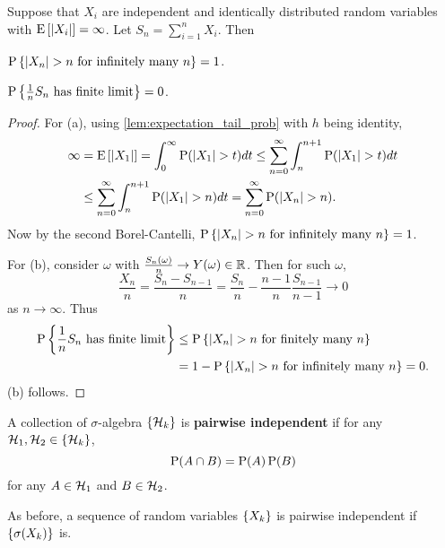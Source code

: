 \begin{proposition}
    Suppose that $X_i$ are independent and identically distributed random variables with 
    $\E\sbrc{\abs{X_i}}=\infty$. Let $S_n = \sum_{i=1}^nX_i$. Then 
    \begin{thmenum}
        \item $\P\set{\abs{X_n}>n\text{ for infinitely many $n$}} = 1$. 
        \item $\P\set{\frac{1}{n}S_n\text{ has finite limit}} = 0$. 
    \end{thmenum}
\end{proposition}
\begin{proof}
    For (a), using \cref{lem:expectation_tail_prob} with $h$ being identity, 
    \begin{equation*}
        \begin{split}
            \infty &= \E\sbrc{\abs{X_1}} = \int_0^\infty\P(\abs{X_1}>t)dt  
            \leq \sum_{n=0}^\infty\int_n^{n+1}\P(\abs{X_1}>t)dt \\
            &\leq \sum_{n=0}^\infty\int_n^{n+1}\P(\abs{X_1}>n)dt 
            = \sum_{n=0}^\infty\P(\abs{X_n}>n). 
        \end{split}
    \end{equation*}
    Now by the second Borel-Cantelli, $\P\set{\abs{X_n}>n\text{ for infinitely many $n$}} = 1$. 

    For (b), consider $\omega$ with $\frac{S_n(\omega)}{n}\to Y(\omega)\in\R$. 
    Then for such $\omega$, 
    \begin{equation*}
        \frac{X_n}{n} = \frac{S_n - S_{n-1}}{n} = \frac{S_n}{n} - \frac{n-1}{n}\frac{S_{n-1}}{n-1}\to 0
    \end{equation*}
    as $n\to\infty$. Thus 
    \begin{equation*}
        \begin{split}
            \P\set{\frac{1}{n}S_n\text{ has finite limit}} &\leq \P\set{\abs{X_n}>n\text{ for finitely many }n} \\
            &= 1 - \P\set{\abs{X_n}>n\text{ for infinitely many $n$}} = 0.           
        \end{split}
    \end{equation*}
    (b) follows. 
\end{proof}

\begin{definition}
    A collection of $\sigma$-algebra $\set{\H_k}$ is \textbf{pairwise independent} 
    if for any $\H_1, \H_2\in\set{\H_k}$, 
    \begin{equation*}
        \P(A\cap B) = \P(A)\P(B)
    \end{equation*}
    for any $A\in\H_1$ and $B\in\H_2$. 
\end{definition}
\begin{remark}
    As before, a sequence of random variables $\set{X_k}$ is 
    pairwise independent if $\set{\sigma(X_k)}$ is. 
\end{remark}

